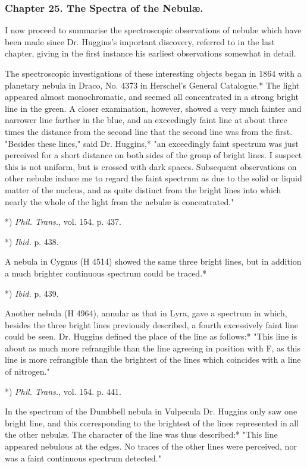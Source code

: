 \documentclass[a4paper, 12pt, oneside, polutonikogreek, english]{article}
\begin{document}
\subsubsection{Chapter 25. The Spectra of the Nebulæ.}

I now proceed to summarise the spectroscopic observations of nebulæ which have been made since Dr. Huggins's important discovery, referred to in the last chapter, giving in the first instance his earliest observations somewhat in detail.

The spectroscopic investigations of these interesting objects began in 1864 with a planetary nebula in Draco, No. 4373 in Herschel's General Catalogue.* The light appeared almost monochromatic, and seemed all concentrated in a strong bright line in the green. A closer examination, however, showed a very much fainter and narrower line farther in the blue, and an exceedingly faint line at about three times the distance from the second line that the second line was from the first. "Besides these lines," said Dr. Huggins,* "an exceedingly faint spectrum was just perceived for a short distance on both sides of the group of bright lines. I suspect this is not uniform, but is crossed with dark spaces. Subsequent observations on other nebulæ induce me to regard the faint spectrum as due to the solid or liquid matter of the nucleus, and as quite distinct from the bright lines into which nearly the whole of the light from the nebulæ is concentrated."

*) \emph{Phil. Trans.}, vol. 154. p. 437.

*) \emph{Ibid.} p. 438.

A nebula in Cygnus (H 4514) showed the same three bright lines, but in addition a much brighter continuous spectrum could be traced.*

*) \emph{Ibid.} p. 439.

Another nebula (H 4964), annular as that in Lyra, gave a spectrum in which, besides the three bright lines previously described, a fourth excessively faint line could be seen. Dr. Huggins defined the place of the line as follows:* "This line is about as much more refrangible than the line agreeing in position with F, as this line is more refrangible than the brightest of the lines which coincides with a line of nitrogen."

*) \emph{Phil. Trans.}, vol. 154. p. 441.

In the spectrum of the Dumbbell nebula in Vulpecula Dr. Huggins only saw one bright line, and this corresponding to the brightest of the lines represented in all the other nebulæ. The character of the line was thus described:* "This line appeared nebulous at the edges. No traces of the other lines were perceived, nor was a faint continuous spectrum detected."
\end{document}
